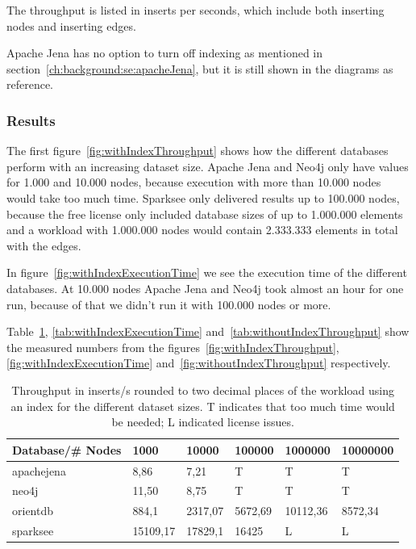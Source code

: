 The throughput is listed in inserts per seconds,
which include both inserting nodes and inserting edges.

Apache Jena has no option to turn off indexing as mentioned in section~\ref{ch:background:se:apacheJena},
but it is still shown in the diagrams as reference.

\subsubsection{Results}
The first figure~\ref{fig:withIndexThroughput} shows how the different databases perform with an increasing dataset size.
Apache Jena and Neo4j only have values for 1.000 and 10.000 nodes,
because execution with more than 10.000 nodes would take too much time.
Sparksee only delivered results up to 100.000 nodes,
because the free license only included database sizes of up to 1.000.000 elements and a workload with 1.000.000 nodes would contain 2.333.333 elements in total with the edges.

In figure~\ref{fig:withIndexExecutionTime} we see the execution time of the different databases.
At 10.000 nodes Apache Jena and Neo4j took almost an hour for one run,
because of that we didn't run it with 100.000 nodes or more.

Table~\ref{tab:withIndexThroughput},
\ref{tab:withIndexExecutionTime} and~\ref{tab:withoutIndexThroughput} show the measured numbers from the figures~\ref{fig:withIndexThroughput},
\ref{fig:withIndexExecutionTime} and~\ref{fig:withoutIndexThroughput} respectively.

\begin{table}[h!]
  \begin{minipage}{\textwidth}
    \centering
    \begin{tabularx}{\textwidth}{ | l | X | X | X | X | X | }
      \hline
      Database/\# Nodes & 1000 & 10000 & 100000 & 1000000 & 10000000 \\ \hline
      apachejena & 8,86 & 7,21 & T & T & T \\ \hline
      neo4j & 11,50 & 8,75 & T & T & T \\ \hline
      orientdb & 884,1 & 2317,07 & 5672,69 & 10112,36 & 8572,34 \\ \hline
      sparksee & 15109,17 & 17829,1 & 16425 & L & L \\ \hline
    \end{tabularx}
  \end{minipage}
  \caption{Throughput in inserts/s rounded to two decimal places of the workload using an index for the different dataset sizes. T indicates that too much time would be needed; L indicated license issues.}
  \label{tab:withIndexThroughput}
\end{table}


